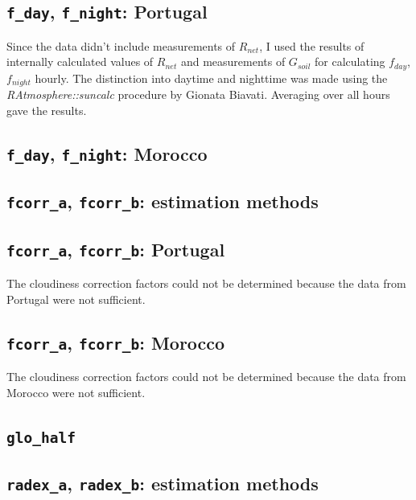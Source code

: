 \documentclass{scrreprt}
\begin{document}
\subsection{\texttt{f\_day}, \texttt{f\_night}: Portugal} \label{ssec:parest_rad_fportugal}

Since the data didn't include measurements of $R_{net}$, I used the results of internally calculated values of $R_{net}$ and measurements of $G_{soil}$ for calculating $f_{day}$, $f_{night}$ hourly.
The distinction into daytime and nighttime was made using the \emph{RAtmosphere::suncalc} procedure by Gionata Biavati.
Averaging over all hours gave the results.

\subsection{\texttt{f\_day}, \texttt{f\_night}: Morocco} \label{ssec:parest_rad_fmorocco}

\subsection{\texttt{fcorr\_a}, \texttt{fcorr\_b}: estimation methods} \label{ssec:parest_rad_fcorrmethods}

\subsection{\texttt{fcorr\_a}, \texttt{fcorr\_b}: Portugal} \label{ssec:parest_rad_fcorrportugal}

The cloudiness correction factors could not be determined because the data from Portugal were not sufficient.

\subsection{\texttt{fcorr\_a}, \texttt{fcorr\_b}: Morocco} \label{ssec:parest_rad_fcorrmorocco}

The cloudiness correction factors could not be determined because the data from Morocco were not sufficient.

\subsection{\texttt{glo\_half}} \label{ssec:parest_rad_glohalf}

\subsection{\texttt{radex\_a}, \texttt{radex\_b}: estimation methods} \label{ssec:parest_rad_radexmethods}
\end{document}
